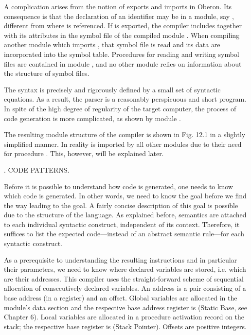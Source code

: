 A complication arises from the notion of exports and imports in Oberon. Its consequence is that the declaration of an identifier  may be in a module, say , different from where  is referenced. If  is exported, the compiler includes  together with its attributes in the symbol file of the compiled module . When compiling another module which imports , that symbol file is read and its data are incorporated into the symbol table. Procedures for reading and writing symbol files are contained in module , and no other module relies on information about the structure of symbol files.

The syntax is precisely and rigorously defined by a small set of syntactic equations. As a result, the parser is a reasonably perspicuous and short program. In spite of the high degree of regularity of the target computer, the process of code generation is more complicated, as shown by module .

The resulting module structure of the compiler is shown in Fig. 12.1 in a slightly simplified manner. In reality  is imported by all other modules due to their need for procedure . This, however, will be explained later.


. CODE PATTERNS.

Before it is possible to understand how code is generated, one needs to know which code is generated. In other words, we need to know the goal before we find the way leading to the goal. A fairly concise description of this goal is possible due to the structure of the language. As explained before, semantics are attached to each individual syntactic construct, independent of its context. Therefore, it suffices to list the expected code---instead of an abstract semantic rule---for each syntactic construct.

As a prerequisite to understanding the resulting instructions and in particular their parameters, we need to know where declared variables are stored, i.e. which are their addresses. This compiler uses the straight-forward scheme of sequential allocation of consecutively declared variables. An address is a pair consisting of a base address (in a register) and an offset. Global variables are allocated in the module's data section and the respective base address register is  (Static Base, see Chapter 6). Local variables are allocated in a procedure activation record on the stack; the respective base register is  (Stack Pointer). Offsets are positive integers.

